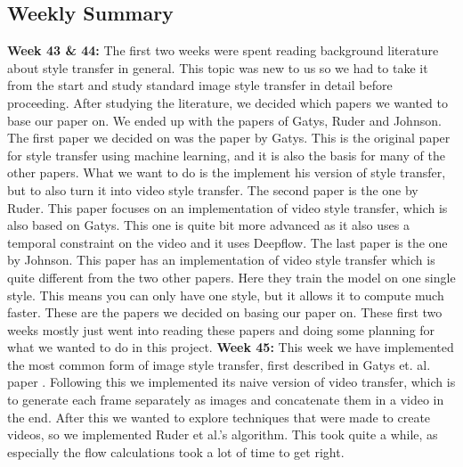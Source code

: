\begin{center}
\section*{Weekly Summary}
\end{center}
\textbf{Week 43 \& 44:} \newline
The first two weeks were spent reading background literature about style transfer in general. This topic was new to us so we had to take it from the start and study standard image style transfer in detail before proceeding.\newline\newline
After studying the literature, we decided which papers we wanted to base our paper on. We ended up with the papers of Gatys, Ruder and Johnson. The first paper we decided on was the paper by Gatys. This is the original paper for style transfer using machine learning, and it is also the basis for many of the other papers. What we want to do is the implement his version of style transfer, but to also turn it into video style transfer.\newline\newline
The second paper is the one by Ruder. This paper focuses on an implementation of video style transfer, which is also based on Gatys. This one is quite bit more advanced as it also uses a temporal constraint on the video and it uses Deepflow.\newline\newline
The last paper is the one by Johnson. This paper has an implementation of video style transfer which is quite different from the two other papers. Here they train the model on one single style. This means you can only have one style, but it allows it to compute much faster.\newline\newline
These are the papers we decided on basing our paper on. These first two weeks mostly just went into reading these papers and doing some planning for what we wanted to do in this project.
\newline\newline
\textbf{Week 45:} \newline
This week we have implemented the most common form of image style transfer, first described in Gatys et. al. paper \cite{Gatys:1}. Following this we implemented its naive version of video transfer, which is to generate each frame separately as images and concatenate them in a video in the end. After this we wanted to explore techniques that were made to create videos, so we implemented Ruder et al.'s algorithm. This took quite a while, as especially the flow calculations took a lot of time to get right.\newline\newline
